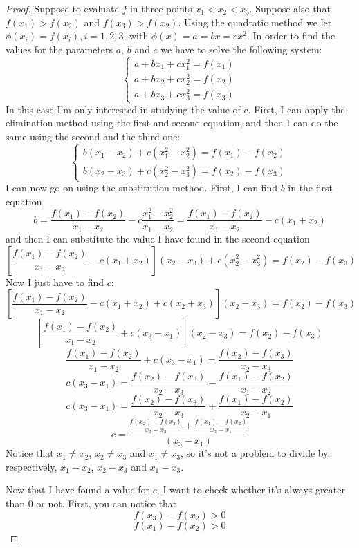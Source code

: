 \begin{proof}
    Suppose to evaluate \(f\) in three points \(x_1<x_2<x_3\). Suppose also that \(f(x_1)>f(x_2)\) and \(f(x_3)>f(x_2)\). Using the quadratic method we let \(\phi(x_i)=f(x_i), i=1,2,3\), with \(\phi(x)=a=bx=cx^2\). In order to find the values for the parameters \(a\), \(b\) and \(c\) we have to solve the following system:
    \[
        \begin{cases}
            a + bx_1 + cx_1^2 = f(x_1) \\
            a + bx_2 + cx_2^2 = f(x_2) \\
            a + bx_3 + cx_3^2 = f(x_3)
        \end{cases}
    \]
    In this case I'm only interested in studying the value of c. First, I can apply the elimination method using the first and second equation, and then I can do the same using the second and the third one:
    \[
        \begin{cases}
            b(x_1 - x_2) + c(x_1^2 - x_2^2) = f(x_1) - f(x_2) \\
            b(x_2 - x_3) + c(x_2^2 - x_3^2) = f(x_2) - f(x_3)
        \end{cases}
    \]
    I can now go on using the substitution method. First, I can find \(b\) in the first equation
    \[b = \frac{f(x_1)-f(x_2)}{x_1-x_2}-c\frac{x_1^2-x_2^2}{x_1-x_2} = \frac{f(x_1)-f(x_2)}{x_1-x_2}-c(x_1+x_2)\]
    and then I can substitute the value I have found in the second equation
    \[\left[\frac{f(x_1)-f(x_2)}{x_1-x_2}-c(x_1+x_2)\right](x_2 - x_3) + c(x_2^2 - x_3^2) = f(x_2) - f(x_3)\]
    Now I just have to find \(c\):
    \[\left[\frac{f(x_1)-f(x_2)}{x_1-x_2}-c(x_1+x_2) + c(x_2 + x_3)\right](x_2 - x_3) = f(x_2) - f(x_3)\]
    \[\left[\frac{f(x_1)-f(x_2)}{x_1-x_2}+c(x_3-x_1)\right](x_2 - x_3) = f(x_2) - f(x_3)\]
    \[\frac{f(x_1)-f(x_2)}{x_1-x_2}+c(x_3-x_1) = \frac{f(x_2) - f(x_3)}{x_2 - x_3}\]
    \[c(x_3-x_1) = \frac{f(x_2) - f(x_3)}{x_2 - x_3} - \frac{f(x_1)-f(x_2)}{x_1-x_2}\]
    \[c(x_3-x_1) = \frac{f(x_2) - f(x_3)}{x_2 - x_3} + \frac{f(x_1)-f(x_2)}{x_2-x_1}\]
    \[c = \frac{\frac{f(x_2) - f(x_3)}{x_2 - x_3} + \frac{f(x_1)-f(x_2)}{x_2-x_1}}{(x_3-x_1)}\]
    Notice that \(x_1 \neq x_2\), \(x_2 \neq x_3\) and \(x_1 \neq x_3\), so it's not a problem to divide by, respectively, \(x_1 - x_2\), \(x_2 - x_3\) and \(x_1 - x_3\).\par
    Now that I have found a value for \(c\), I want to check whether it's always greater than \(0\) or not. First, you can notice that
    \[f(x_3)-f(x_2)>0\]
    \[f(x_1)-f(x_2)>0\]

\end{proof}
